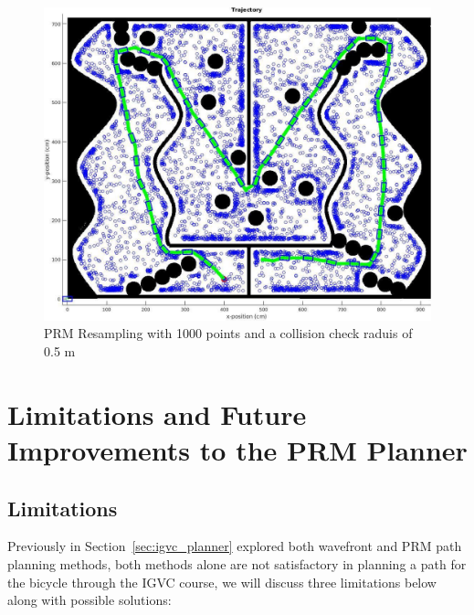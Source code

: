 \documentclass{article}
\begin{document}
\begin{figure}[H]
	\centering
	\includegraphics[width=\linewidth]{images/prm_resampling.jpg}
	\caption{PRM Resampling with 1000 points and a collision check raduis of 0.5 m}
	\label{fig:prm_resampling}
\end{figure}


\section{Limitations and Future Improvements to the PRM Planner}
\subsection{Limitations}

Previously in Section~\ref{sec:igvc_planner}  explored both wavefront and PRM path planning methods, both methods alone are not satisfactory in planning a path for the bicycle through the IGVC course, we will discuss three limitations below along with possible solutions:
\end{document}
